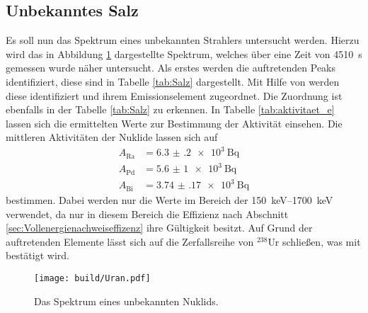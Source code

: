 \subsection{Unbekanntes Salz}
\label{sec:Salz}
Es soll nun das Spektrum eines unbekannten Strahlers untersucht werden. Hierzu wird das in Abbildung \ref{fig:Salz}
dargestellte Spektrum, welches über eine Zeit von \SI{4510}{\second} gemessen wurde näher untersucht.
Als erstes werden die auftretenden Peaks identifiziert, diese sind in Tabelle \ref{tab:Salz} dargestellt.
Mit Hilfe von \cite{referenz1} werden diese identifiziert und ihrem Emissionselement zugeordnet. Die Zuordnung ist
ebenfalls in der Tabelle \ref{tab:Salz} zu erkennen.
In Tabelle \ref{tab:aktivitaet_e} lassen sich die ermittelten Werte zur Bestimmung der Aktivität einsehen.
Die mittleren Aktivitäten der Nuklide lassen sich auf
\begin{align*}
  A_\text{Ra} & = \SI{6.3(2)e3}{\becquerel} \\
  A_\text{Pd} & = \SI{5.6(10)e3}{\becquerel} \\
  A_\text{Bi} & = \SI{3.74(17)e3}{\becquerel}
\end{align*}
bestimmen. Dabei werden nur die Werte im Bereich der \SIrange{150}{1700}{\kilo\electronvolt} verwendet, 
da nur in diesem Bereich die Effizienz nach Abschnitt \ref{sec:Vollenergienachweiseffizenz} ihre Gültigkeit besitzt.
Auf Grund der auftretenden Elemente lässt sich auf die Zerfallsreihe
von ${}^{238}$Ur schließen, was mit \cite{referenz1} bestätigt wird.


\begin{figure}[htb]
 \centering
 \texttt{[image: build/Uran.pdf]}
 \caption{Das Spektrum eines unbekannten Nuklids.}
 \label{fig:Salz}
\end{figure}


